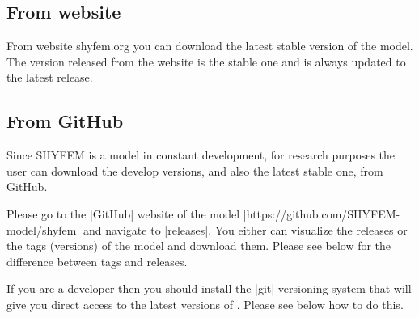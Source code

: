 
%
%
%
%
%
%
%
\label{where} 

\subsection{From website}
From website shyfem.org you can download the latest stable version of the model.
The version released from the website is the stable one and is always updated to the latest release. 
\subsection{From GitHub}

Since SHYFEM is a model in constant development, for research purposes the user can download the develop versions, 
and also the latest stable one, from GitHub.


Please go to the |GitHub| website of the \shyfem{} model
|https://github.com/SHYFEM-model/shyfem| and navigate to |releases|.  
You either can visualize the releases or the tags (versions)
of the model and download them. Please see below for the difference
between tags and releases.

If you are a developer then you should install the |git|
versioning system that will give you direct access to the latest versions
of \shyfem{}.  Please see below how to do this.

